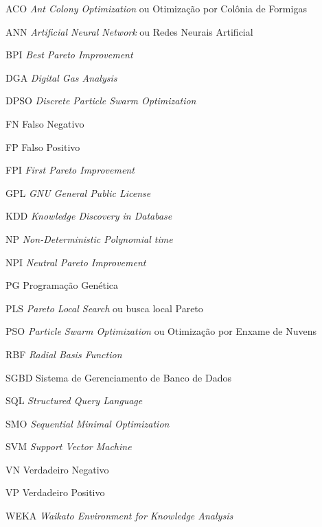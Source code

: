 \documentclass[
	12pt,				%
	openany,			%
	oneside,	
	a4paper,			%
	brazil,				%
	]{unimontes-ppgmsc-abntex2}
\begin{document}



\clearpage



\clearpage


\clearpage

\tableofcontents*
\clearpage

\begin{siglas}
  \item[ACO]  {\em Ant Colony Optimization} ou Otimização por Colônia de Formigas
  \item[ANN]  {\em Artificial Neural Network} ou Redes Neurais Artificial
  \item[BPI]  {\em Best Pareto Improvement}
  \item[DGA]  {\em Digital Gas Analysis}
  \item[DPSO] {\em Discrete Particle Swarm Optimization}
  \item[FN]   Falso Negativo
  \item[FP]   Falso Positivo
  \item[FPI]  {\em First Pareto Improvement}
  \item[GPL]  {\em GNU General Public License}
  \item[KDD]  {\em Knowledge Discovery in Database}
  \item[NP]   {\em Non-Deterministic Polynomial time}
  \item[NPI]  {\em Neutral Pareto Improvement}
  \item[PG]   Programação Genética
  \item[PLS]  {\em Pareto Local Search} ou busca local Pareto
  \item[PSO]  {\em Particle Swarm Optimization} ou Otimização por Enxame de Nuvens
  \item[RBF]  {\em Radial Basis Function}
  \item[SGBD] Sistema de Gerenciamento de Banco de Dados
  \item[SQL]  {\em Structured Query Language}
  \item[SMO]  {\em Sequential Minimal Optimization}
  \item[SVM]  {\em Support Vector Machine}
  \item[VN]   Verdadeiro Negativo
  \item[VP]   Verdadeiro Positivo
  \item[WEKA] {\em Waikato Environment for Knowledge Analysis}
\end{siglas}
\end{document}
